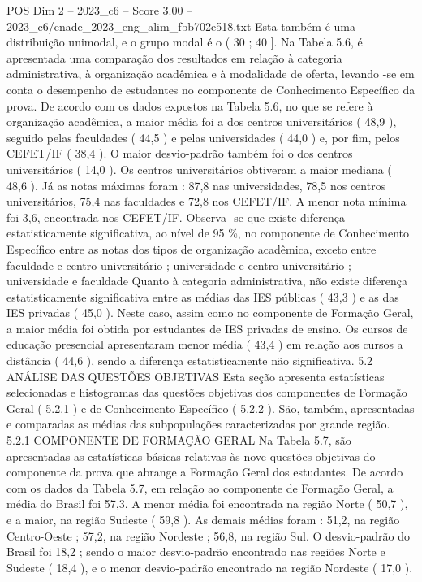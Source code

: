 \begin{textsample}{POS Dim 2 – 2023\_c6 – Score 3.00 – 2023\_c6/enade\_2023\_eng\_alim\_fbb702e518.txt}
Esta também é uma distribuição unimodal, e o grupo modal é o ( 30 ; 40 ].
Na Tabela 5.6, é apresentada uma comparação dos resultados em relação à categoria administrativa, à organização acadêmica e à modalidade de oferta, levando -se em conta o desempenho de estudantes no componente de Conhecimento Específico da prova.
De acordo com os dados expostos na Tabela 5.6, no que se refere à organização acadêmica, a maior média foi a dos centros universitários ( 48,9 ), seguido pelas faculdades ( 44,5 ) e pelas universidades ( 44,0 ) e, por fim, pelos CEFET/IF ( 38,4 ).
O maior desvio-padrão também foi o dos centros universitários ( 14,0 ).
Os centros universitários obtiveram a maior mediana ( 48,6 ).
Já as notas máximas foram : 87,8 nas universidades, 78,5 nos centros universitários, 75,4 nas faculdades e 72,8 nos CEFET/IF.
A menor nota mínima foi 3,6, encontrada nos CEFET/IF.
Observa -se que existe diferença estatisticamente significativa, ao nível de 95 \%, no componente de Conhecimento Específico entre as notas dos tipos de organização acadêmica, exceto entre faculdade e centro universitário ; universidade e centro universitário ; universidade e faculdade Quanto à categoria administrativa, não existe diferença estatisticamente significativa entre as médias das IES públicas ( 43,3 ) e as das IES privadas ( 45,0 ).
Neste caso, assim como no componente de Formação Geral, a maior média foi obtida por estudantes de IES privadas de ensino.
Os cursos de educação presencial apresentaram menor média ( 43,4 ) em relação aos cursos a distância ( 44,6 ), sendo a diferença estatisticamente não significativa. 5.2 ANÁLISE DAS QUESTÕES OBJETIVAS Esta seção apresenta estatísticas selecionadas e histogramas das questões objetivas dos componentes de Formação Geral ( 5.2.1 ) e de Conhecimento Específico ( 5.2.2 ).
São, também, apresentadas e comparadas as médias das subpopulações caracterizadas por grande região. 5.2.1 COMPONENTE DE FORMAÇÃO GERAL Na Tabela 5.7, são apresentadas as estatísticas básicas relativas às nove questões objetivas do componente da prova que abrange a Formação Geral dos estudantes.
De acordo com os dados da Tabela 5.7, em relação ao componente de Formação Geral, a média do Brasil foi 57,3.
A menor média foi encontrada na região Norte ( 50,7 ), e a maior, na região Sudeste ( 59,8 ).
As demais médias foram : 51,2, na região Centro-Oeste ; 57,2, na região Nordeste ; 56,8, na região Sul.
O desvio-padrão do Brasil foi 18,2 ; sendo o maior desvio-padrão encontrado nas regiões Norte e Sudeste ( 18,4 ), e o menor desvio-padrão encontrado na região Nordeste ( 17,0 ).

\end{textsample}
